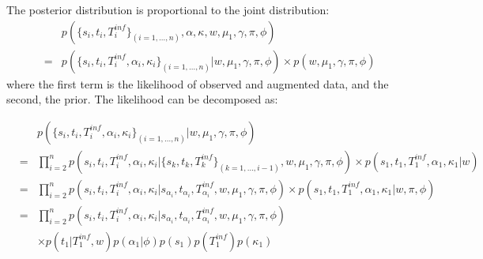\documentclass[10pt]{article}
\begin{document}
The posterior distribution is proportional to the joint distribution:
\begin{eqnarray}
& & p(\{s_i, t_i, T_i^{inf}\}_{(i=1,\ldots,n)}, \alpha, \kappa, w, \mu_1, \gamma, \pi, \phi)\\
& = & p(\{s_i, t_i, T_i^{inf}, \alpha_i, \kappa_i\}_{(i=1,\ldots,n)}| w, \mu_1, \gamma, \pi, \phi) \times p( w, \mu_1, \gamma, \pi, \phi)
\end{eqnarray}
where the first term is the likelihood of observed and augmented data, and the second, the prior.
The likelihood can be decomposed as:

\begin{eqnarray}
& & p(\{s_i, t_i, T_i^{inf}, \alpha_i, \kappa_i\}_{(i=1,\ldots,n)}|  w, \mu_1, \gamma, \pi, \phi) \\
& = & \prod_{i=2}^n p(s_i, t_i, T_i^{inf}, \alpha_i, \kappa_i | \{s_k, t_k, T_k^{inf} \}_{(k=1,\ldots,i-1)}, w, \mu_1, \gamma, \pi, \phi) 
  \times p(s_1, t_1, T_1^{inf}, \alpha_1, \kappa_1 |w)\\
& = & \prod_{i=2}^n p(s_i, t_i, T_i^{inf}, \alpha_i, \kappa_i| s_{\alpha_i}, t_{\alpha_i}, T_{\alpha_i}^{inf},  w, \mu_1, \gamma, \pi, \phi) 
  \times p(s_1, t_1 , T_1^{inf}, \alpha_1, \kappa_1 |w, \pi, \phi)\\
& = & \prod_{i=2}^n p(s_i, t_i, T_i^{inf}, \alpha_i, \kappa_i | s_{\alpha_i}, t_{\alpha_i}, T_{\alpha_i}^{inf},  w, \mu_1, \gamma, \pi, \phi)\\ 
 & & \times p(t_1 | T_1^{inf},w) p(\alpha_1 | \phi) p(s_1) p(T_1^{inf}) p(\kappa_1) 
\end{eqnarray}
\end{document}
